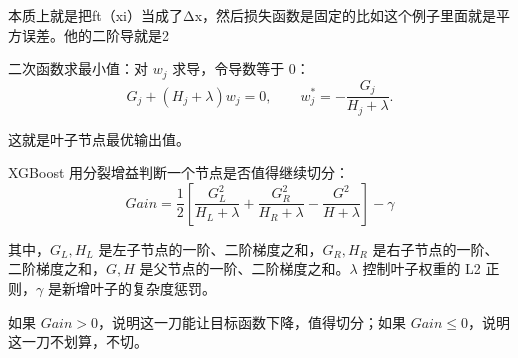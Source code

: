 \begin{dxtips}
    本质上就是把ft（xi）当成了Δx，然后损失函数是固定的比如这个例子里面就是平方误差。他的二阶导就是2
\end{dxtips}
\begin{note}
    二次函数求最小值：对 $w_j$ 求导，令导数等于 $0$：
\[
G_j + (H_j+\lambda)w_j = 0,
\qquad
w_j^*
=
-
\frac{G_j}{H_j+\lambda}.
\]

这就是叶子节点最优输出值。
\end{note}
\begin{note}
XGBoost 用分裂增益判断一个节点是否值得继续切分：
\[
Gain
=
\frac{1}{2}
\left[
\frac{G_L^2}{H_L+\lambda}
+
\frac{G_R^2}{H_R+\lambda}
-
\frac{G^2}{H+\lambda}
\right]
-
\gamma
\]

其中，$G_L,H_L$ 是左子节点的一阶、二阶梯度之和，$G_R,H_R$ 是右子节点的一阶、二阶梯度之和，$G,H$ 是父节点的一阶、二阶梯度之和。$\lambda$ 控制叶子权重的 L2 正则，$\gamma$ 是新增叶子的复杂度惩罚。

如果 $Gain>0$，说明这一刀能让目标函数下降，值得切分；如果 $Gain\le 0$，说明这一刀不划算，不切。
\end{note}

